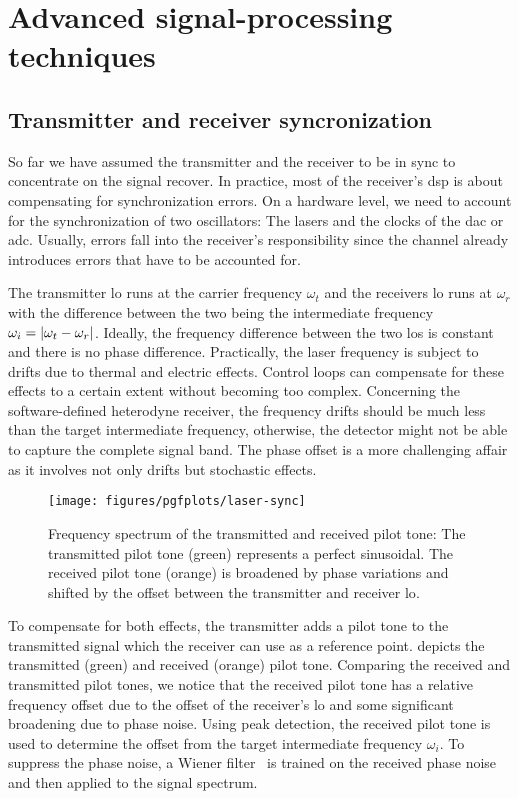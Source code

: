 \chapter{Advanced signal-processing techniques}

\section{Transmitter and receiver syncronization}

\cite[p.~359]{Proakis2007} %
\cite{Godard1978} %
\cite{Huang2015,Qi2015,Soh2015} %

So far we have assumed the transmitter and the receiver to be in sync to concentrate on the signal recover.
In practice, most of the receiver's \gls{dsp} is about compensating for synchronization errors.
On a hardware level, we need to account for the synchronization of two oscillators:
The lasers and the clocks of the \gls{dac} or \gls{adc}.
Usually, errors fall into the receiver's responsibility since the channel already introduces errors that have to be accounted for.

The transmitter \gls{lo} runs at the carrier frequency $\omega_t$ and the receivers \gls{lo} runs at $\omega_r$ with the difference between the two being the intermediate frequency $\omega_i=\lvert\omega_t-\omega_r\rvert$.
Ideally, the frequency difference between the two \gls{lo}s is constant and there is no phase difference.
Practically, the laser frequency is subject to drifts due to thermal and electric effects.
Control loops can compensate for these effects to a certain extent without becoming too complex.
Concerning the software-defined heterodyne receiver, the frequency drifts should be much less than the target intermediate frequency, otherwise, the detector might not be able to capture the complete signal band.
The phase offset is a more challenging affair as it involves not only drifts but stochastic effects.
\begin{figure}[htb]
	\centering
	\texttt{[image: figures/pgfplots/laser-sync]}
	\caption{Frequency spectrum of the transmitted and received pilot tone: The transmitted pilot tone (green) represents a perfect sinusoidal. The received pilot tone (orange) is broadened by phase variations and shifted by the offset between the transmitter and receiver \gls{lo}.}\label{fig:pilot_tones}
\end{figure}
To compensate for both effects, the transmitter adds a pilot tone to the transmitted signal which the receiver can use as a reference point.
 depicts the transmitted (green) and received (orange) pilot tone.
Comparing the received and transmitted pilot tones, we notice that the received pilot tone has a relative frequency offset due to the offset of the receiver's \gls{lo} and some significant broadening due to phase noise.
Using peak detection, the received pilot tone is used to determine the offset from the target intermediate frequency $\omega_i$.
To suppress the phase noise, a Wiener filter~\cite{Chen2006} is trained on the received phase noise and then applied to the signal spectrum.

